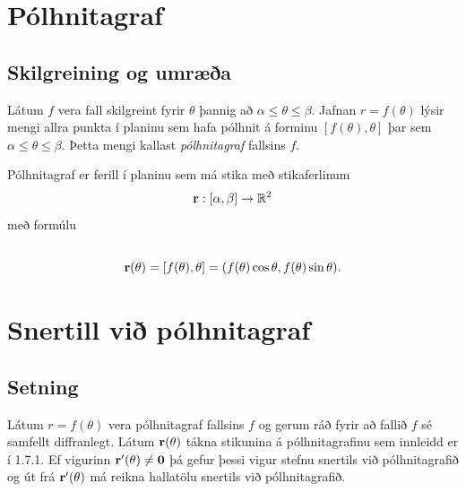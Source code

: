 \documentclass[a4paper,10pt,icelandic]{sphinxmanual}
\begin{document}
\section{Pólhnitagraf}
\label{Kafli1:polhnitagraf}

\subsection{Skilgreining og umræða}
\label{Kafli1:index-9}\label{Kafli1:id10}
Látum \(f\) vera fall skilgreint fyrir \(\theta\) þannig að
\(\alpha\leq\theta\leq\beta\). Jafnan \(r=f(\theta)\) lýsir
mengi allra punkta í planinu sem hafa pólhnit á forminu
\([f(\theta),\theta]\) þar sem \(\alpha\leq\theta\leq\beta\).
Þetta mengi kallast \emph{pólhnitagraf} fallsins \(f\).

Pólhnitagraf er ferill í planinu sem má stika með stikaferlinum
\begin{gather}
\begin{split}\displaystyle \mbox{${\bf r}$}:[\alpha,\beta]\rightarrow{\mathbb  R}^2\end{split}\notag
\end{gather}
með formúlu
\begin{gather}
\begin{split}\displaystyle\end{split}\notag\\\begin{split}\mbox{${\bf r}$}(\theta)=[f(\theta),\theta]=
(f(\theta)\cos\theta, f(\theta)\sin\theta).\end{split}\notag
\end{gather}

\section{Snertill við pólhnitagraf}
\label{Kafli1:snertill-vi-polhnitagraf}\label{Kafli1:index-10}

\subsection{Setning}
\label{Kafli1:id11}
Látum \(r=f(\theta)\) vera pólhnitagraf fallsins \(f\) og gerum
ráð fyrir að fallið \(f\) sé samfellt diffranlegt. Látum
\(\mbox{${\bf r}$}(\theta)\) tákna stikunina á pólhnitagrafinu sem
innleidd er í 1.7.1. Ef vigurinn
\(\mbox{${\bf r}$}'(\theta)\neq \mbox{${\bf 0}$}\) þá gefur þessi
vigur stefnu snertils við pólhnitagrafið og út frá
\(\mbox{${\bf r}$}'(\theta)\) má reikna hallatölu snertils við
pólhnitagrafið.
\end{document}
